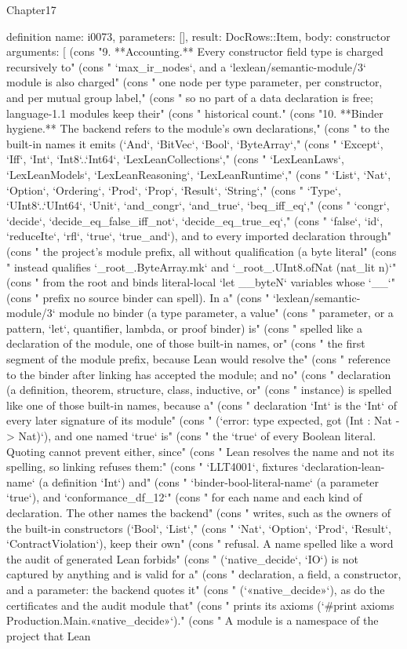 \begin{lexlean}{Chapter17}
\begin{semanticmodule}
definition{
  name: i0073,
  parameters: [],
  result: DocRows::Item,
  body: constructor{
    arguments: [
      (cons "9. **Accounting.** Every constructor field type is charged recursively to" (cons "   `max_ir_nodes`, and a `lexlean/semantic-module/3` module is also charged" (cons "   one node per type parameter, per constructor, and per mutual group label," (cons "   so no part of a data declaration is free; language-1.1 modules keep their" (cons "   historical count." (cons "10. **Binder hygiene.** The backend refers to the module's own declarations," (cons "    to the built-in names it emits (`And`, `BitVec`, `Bool`, `ByteArray`," (cons "    `Except`, `Iff`, `Int`, `Int8`..`Int64`, `LexLeanCollections`," (cons "    `LexLeanLaws`, `LexLeanModels`, `LexLeanReasoning`, `LexLeanRuntime`," (cons "    `List`, `Nat`, `Option`, `Ordering`, `Prod`, `Prop`, `Result`, `String`," (cons "    `Type`, `UInt8`..`UInt64`, `Unit`, `and_congr`, `and_true`, `beq_iff_eq`," (cons "    `congr`, `decide`, `decide_eq_false_iff_not`, `decide_eq_true_eq`," (cons "    `false`, `id`, `reduceIte`, `rfl`, `true`, `true_and`), and to every imported declaration through" (cons "    the project's module prefix, all without qualification (a byte literal" (cons "    instead qualifies `_root_.ByteArray.mk` and `_root_.UInt8.ofNat (nat_lit n)`" (cons "    from the root and binds literal-local `let __byteN` variables whose `__`" (cons "    prefix no source binder can spell). In a" (cons "    `lexlean/semantic-module/3` module no binder (a type parameter, a value" (cons "    parameter, or a pattern, `let`, quantifier, lambda, or proof binder) is" (cons "    spelled like a declaration of the module, one of those built-in names, or" (cons "    the first segment of the module prefix, because Lean would resolve the" (cons "    reference to the binder after linking has accepted the module; and no" (cons "    declaration (a definition, theorem, structure, class, inductive, or" (cons "    instance) is spelled like one of those built-in names, because a" (cons "    declaration `Int` is the `Int` of every later signature of its module" (cons "    (`error: type expected, got (Int : Nat -> Nat)`), and one named `true` is" (cons "    the `true` of every Boolean literal. Quoting cannot prevent either, since" (cons "    Lean resolves the name and not its spelling, so linking refuses them:" (cons "    `LLT4001`, fixtures `declaration-lean-name` (a definition `Int`) and" (cons "    `binder-bool-literal-name` (a parameter `true`), and `conformance_df_12`" (cons "    for each name and each kind of declaration. The other names the backend" (cons "    writes, such as the owners of the built-in constructors (`Bool`, `List`," (cons "    `Nat`, `Option`, `Prod`, `Result`, `ContractViolation`), keep their own" (cons "    refusal. A name spelled like a word the audit of generated Lean forbids" (cons "    (`native_decide`, `IO`) is not captured by anything and is valid for a" (cons "    declaration, a field, a constructor, and a parameter: the backend quotes it" (cons "    (`«native_decide»`), as do the certificates and the audit module that" (cons "    prints its axioms (`#print axioms Production.Main.«native_decide»`)." (cons "    A module is a namespace of the project that Lean }}
\end{semanticmodule}
\end{lexlean}

